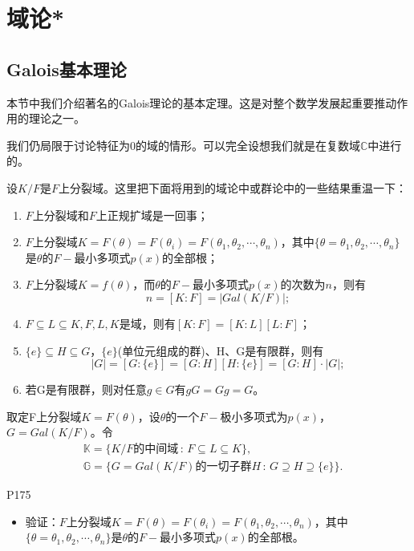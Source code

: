 \section{域论*}
\subsection{Galois基本理论}
\original
{
	本节中我们介绍著名的Galois理论的基本定理。这是对整个数学发展起重要推动作用的理论之一。
	\par
	我们仍局限于讨论特征为0的域的情形。可以完全设想我们就是在复数域$\mathbb{C}$中进行的。
	\par
	设$K/F$是$F$上分裂域。这里把下面将用到的域论中或群论中的一些结果重温一下：
	\begin{enumerate}
		\item $F$上分裂域和$F$上正规扩域是一回事；
		\item $F$上分裂域$K=F(\theta)=F(\theta_{i})=F(\theta_{1},\theta_{2},\cdots,\theta_{n})$，其中$\{\theta=\theta_{1},\theta_{2},\cdots,\theta_{n}\}$是$\theta$的$F-$最小多项式$p(x)$的全部根；
		\item $F$上分裂域$K=f(\theta)$，而$\theta$的$F-$最小多项式$p(x)$的次数为$n$，则有
		\begin{equation*}
			n=[K:F]=|Gal(K/F)|;
		\end{equation*}
		\item $F\subseteq L \subseteq K,F,L,K$是域，则有$[K:F]=[K:L][L:F]$；
		\item $\{e\}\subseteq H\subseteq G$，$\{e\}$(单位元组成的群)、H、G是有限群，则有
		\begin{equation*}
			|G|=[G:\{e\}]=[G:H][H:\{e\}]=[G:H]\cdot|G|;
		\end{equation*}
	
		\item 若G是有限群，则对任意$g\in G$有$gG=Gg=G$。
	\end{enumerate}
	取定F上分裂域$K=F(\theta)$，设$\theta$的一个$F-$极小多项式为$p(x)$，$G=Gal(K/F)$。令
	\begin{equation*}
		\begin{aligned}
			&\mathbb{K}=\{K/F\text{的中间域}\,:\, F\subseteq L\subseteq K \} ,\\
			&\mathbb{G}=\{G=Gal(K/F)\text{的一切子群}H\, :\, G\supseteq H\supseteq\{e\}\}.
		\end{aligned}
	\end{equation*}
}
{P175}
\begin{proposition}
	\begin{itemize}
		\item 验证：$F$上分裂域$K=F(\theta)=F(\theta_{i})=F(\theta_{1},\theta_{2},\cdots,\theta_{n})$，其中$\{\theta=\theta_{1},\theta_{2},\cdots,\theta_{n}\}$是$\theta$的$F-$最小多项式$p(x)$的全部根。
		
	\end{itemize}
\end{proposition}

